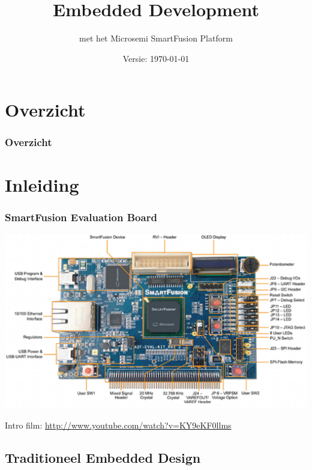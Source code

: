 \documentclass{beamer}
\title[]{Embedded Development}
\subtitle{met het Microsemi SmartFusion Platform}
\author{}
\institute{Jeroen Doggen\\ jeroen.doggen@artesis.be \\Artesis Hogeschool Antwerpen}
\date{Versie: \today}
\begin{document}
\maketitle

\section*{Overzicht}
\begin{frame}
\frametitle{Overzicht}
\tableofcontents
\end{frame}


\section{Inleiding}

\begin{frame} 
\frametitle{SmartFusion Evaluation Board}

\includegraphics[width=1\textwidth]{./images/SmartFusion.jpeg}

Intro film: %
\url{http://www.youtube.com/watch?v=KY9eKF0llms} %
\end{frame}


\subsection{Traditioneel Embedded Design}
\end{document}
